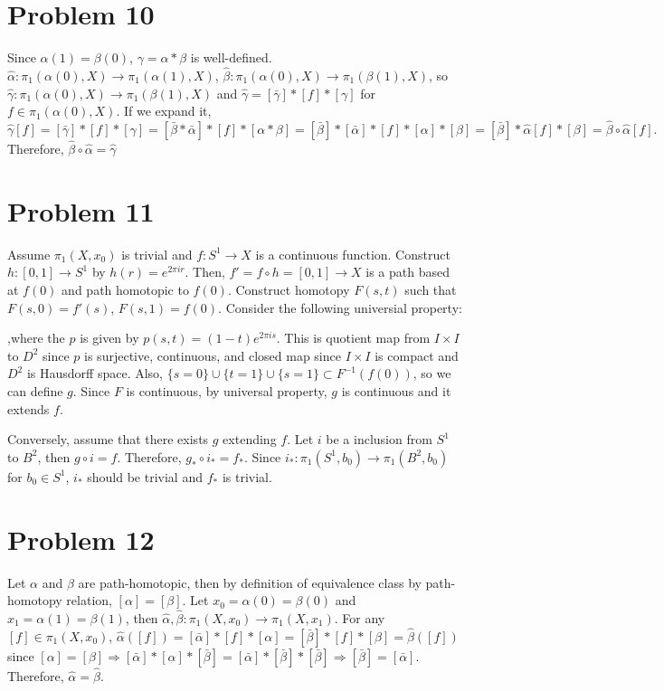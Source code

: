 \documentclass{article}
\begin{document}
\section*{Problem 10}
Since $\alpha(1)=\beta(0)$, $\gamma=\alpha*\beta$ is well-defined. $\hat{\alpha}:\pi_1(\alpha(0), X)\rightarrow \pi_1(\alpha(1), X)$, $\hat{\beta}:\pi_1(\alpha(0), X)\rightarrow \pi_1(\beta(1), X)$, so $\hat{\gamma}:\pi_1(\alpha(0), X)\rightarrow \pi_1(\beta(1), X)$ and $\hat{\gamma}=[\bar{\gamma}]*[f]*[\gamma]$ for $f\in\pi_1(\alpha(0), X)$. If we expand it,
\begin{equation*}
\hat{\gamma}[f]=[\bar{\gamma}]*[f]*[\gamma]=[\bar{\beta}*\bar{\alpha}]*[f]*[\alpha*\beta]=[\bar{\beta}]*[\bar{\alpha}]*[f]*[\alpha]*[\beta]=[\bar{\beta}]*\hat{\alpha}[f]*[\beta]=\hat{\beta}\circ \hat{\alpha}[f].
\end{equation*}
Therefore, $\hat{\beta}\circ \hat{\alpha}=\hat{\gamma}$
\section*{Problem 11}
Assume $\pi_1(X, x_0)$ is trivial and $f:S^1\rightarrow X$ is a continuous function. Construct $h:[0,1]\rightarrow S^1$ by $h(r)=e^{2\pi i r}$. Then, $f'=f\circ h=[0,1]\rightarrow X$ is a path based at $f(0)$ and path homotopic to $f(0)$. Construct homotopy $F(s,t)$ such that $F(s, 0)=f'(s)$, $F(s,1)=f(0)$. Consider the following universial property:
\begin{figure}[h]
\centering
{}
\end{figure}
,where the $p$ is given by $p(s,t)=(1-t)e^{2\pi i s}$. This is quotient map from $I\times I$ to $D^2$ since $p$ is surjective, continuous, and closed map since $I\times I$ is compact and $D^2$ is Hausdorff space. Also, $\{s=0\}\cup\{t=1\}\cup \{s=1\}\subset F^{-1}(f(0))$, so we can define $g$. Since $F$ is continuous, by universal property, $g$ is continuous and it extends $f$.

Conversely, assume that there exists $g$ extending $f$. Let $i$ be a inclusion from $S^1$ to $B^2$, then $g\circ i=f$. Therefore, $g_*\circ i_*=f_*$. Since $i_*:\pi_1(S^1, b_0)\rightarrow \pi_1(B^2, b_0)$ for $b_0\in S^1$, $i_*$ should be trivial and $f_*$ is trivial. 
\section*{Problem 12}
Let $\alpha$ and $\beta$ are path-homotopic, then by definition of equivalence class by path-homotopy relation, $[\alpha]=[\beta]$. Let $x_0=\alpha(0)=\beta(0)$ and $x_1=\alpha(1)=\beta(1)$, then $\hat{\alpha},\hat{\beta}:\pi_1(X, x_0)\rightarrow \pi_1(X, x_1)$. For any $[f]\in \pi_1(X, x_0)$, $\hat{\alpha}([f])=[\bar{\alpha}]*[f]*[\alpha]=[\bar{\beta}]*[f]*[\beta]=\hat{\beta}([f])$ since $[\alpha]=[\beta]\Rightarrow [\bar{\alpha}]*[\alpha]*[\bar{\beta}]=[\bar{\alpha}]*[\bar{\beta}]*[\bar{\beta}]\Rightarrow [\bar{\beta}]=[\bar{\alpha}]$. Therefore, $\hat{\alpha}=\hat{\beta}$.
\end{document}
